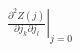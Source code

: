 \documentclass[preview]{standalone}
\begin{document}
\begin{align*}
\left. \frac{\partial^2 Z(j)}{\partial j_k \partial j_l} \right|_{j=0}
\end{align*}
\end{document}
